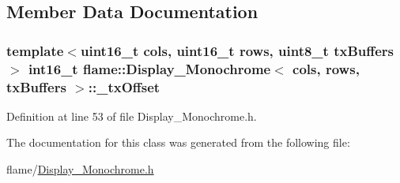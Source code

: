 \subsection{Member Data Documentation}
\hypertarget{classflame_1_1_display___monochrome_abd53e31a2433730e2390152b7c24918f}{
\subsubsection[{\-\_\-tx\-Offset}]{\setlength{\rightskip}{0pt plus 5cm}template$<$uint16\-\_\-t cols, uint16\-\_\-t rows, uint8\-\_\-t tx\-Buffers$>$ int16\-\_\-t {\bf flame\-::\-Display\-\_\-\-Monochrome}$<$ cols, rows, tx\-Buffers $>$\-::\-\_\-tx\-Offset\hspace{0.3cm}{\ttfamily [protected]}}}\label{classflame_1_1_display___monochrome_abd53e31a2433730e2390152b7c24918f}


Definition at line 53 of file Display\-\_\-\-Monochrome.\-h.



The documentation for this class was generated from the following file\-:\begin{DoxyCompactItemize}
\item 
flame/\hyperlink{_display___monochrome_8h}{Display\-\_\-\-Monochrome.\-h}\end{DoxyCompactItemize}
